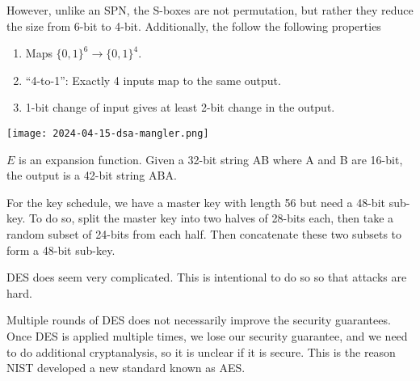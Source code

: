 However, unlike an SPN, the S-boxes are not permutation, but rather they reduce the size from 6-bit to 4-bit. Additionally, the follow the following properties
\begin{enumerate}
    \item Maps $\{0, 1\}^6 \to \{0, 1\}^4$.
    \item ``4-to-1'': Exactly 4 inputs map to the same output.
    \item 1-bit change of input gives at least 2-bit change in the output.
\end{enumerate}

\begin{center}
    \texttt{[image: 2024-04-15-dsa-mangler.png]}
\end{center}

$E$ is an expansion function. Given a 32-bit string AB where A and B are 16-bit, the output is a 42-bit string ABA.

For the key schedule, we have a master key with length 56 but need a 48-bit sub-key. To do so, split the master key into two halves of 28-bits each, then take a random subset of 24-bits from each half. Then concatenate these two subsets to form a 48-bit sub-key.

\begin{remark}
    DES does seem very complicated. This is intentional to do so so that attacks are hard.

    Multiple rounds of DES does not necessarily improve the security guarantees. Once DES is applied multiple times, we lose our security guarantee, and we need to do additional cryptanalysis, so it is unclear if it is secure. This is the reason NIST developed a new standard known as AES.
\end{remark}
